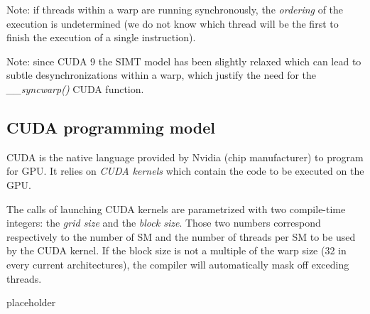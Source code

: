 \documentclass{article}
\begin{document}
Note: if threads within a warp are running synchronously, the \textit{ordering} of the execution is undetermined (we do not know which thread will be the first to finish the execution of a single instruction).

Note: since CUDA 9 the SIMT model has been slightly relaxed which can lead to subtle desynchronizations within a warp, which justify the need for the \textit{\_\_syncwarp()} CUDA function.

\subsection{CUDA programming model}

CUDA is the native language provided by Nvidia (chip manufacturer) to program for GPU. It relies on \textit{CUDA kernels} which contain the code to be executed on the GPU. 

The calls of launching CUDA kernels are parametrized with two compile-time integers: the \textit{grid size} and the \emph{block size}. Those two numbers correspond respectively to the number of SM and the number of threads per SM to be used by the CUDA kernel. If the block size is not a multiple of the warp size (32 in every current architectures), the compiler will automatically mask off exceding threads.

placeholder\cite{cudasharedmemory}

\newpage
\nocite{*}


\end{document}

